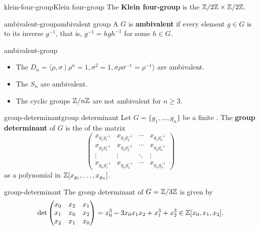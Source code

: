 \begin{topic}{klein-four-group}{Klein four-group}
    The \textbf{Klein four-group} is the  $\mathbb{Z}/2\mathbb{Z} \times \mathbb{Z}/2\mathbb{Z}$.
\end{topic}

\begin{topic}{ambivalent-group}{ambivalent group}
    A  $G$ is \textbf{ambivalent} if every element $g \in G$ is  to its inverse $g^{-1}$, that is, $g^{-1} = hgh^{-1}$ for some $h \in G$.
\end{topic}

\begin{example}{ambivalent-group}
    \begin{itemize}
        \item The  $D_n = \langle \rho, \sigma \mid \rho^n = 1, \sigma^2 = 1, \sigma \rho \sigma^{-1} = \rho^{-1} \rangle$ are ambivalent.
        \item The  $S_n$ are ambivalent.
        \item The cyclic groups $\mathbb{Z}/n\mathbb{Z}$ are not ambivalent for $n \ge 3$.
    \end{itemize}
\end{example}

\begin{topic}{group-determinant}{group determinant}
    Let $G = \{ g_1, \ldots, g_n \}$ be a finite . The \textbf{group determinant} of $G$ is the  of the matrix
    \[ \begin{pmatrix}
        x_{g_1 g_1^{-1}} & x_{g_1 g_2^{-1}} & \cdots & x_{g_1 g_n^{-1}} \\ 
        x_{g_2 g_1^{-1}} & x_{g_2 g_2^{-1}} & \cdots & x_{g_2 g_n^{-1}} \\ 
        \vdots & \vdots & \ddots & \vdots \\
        x_{g_n g_1^{-1}} & x_{g_n g_2^{-1}} & \cdots & x_{g_n g_n^{-1}}
    \end{pmatrix} \]
    as a polynomial in $\mathbb{Z}[x_{g_1}, \ldots, x_{g_n}]$.
\end{topic}

\begin{example}{group-determinant}
    The group determinant of $G = \mathbb{Z}/3\mathbb{Z}$ is given by
    \[ \det \begin{pmatrix} x_{0} & x_{2} & x_{1} \\ x_{1} & x_{0} & x_{2} \\ x_{2} & x_{1} & x_{0} \end{pmatrix} = x_{0}^{3} - 3 x_{0} x_{1} x_{2} + x_{1}^{3} + x_{2}^{3} \in \mathbb{Z}[x_0, x_1, x_2] . \]
\end{example}

